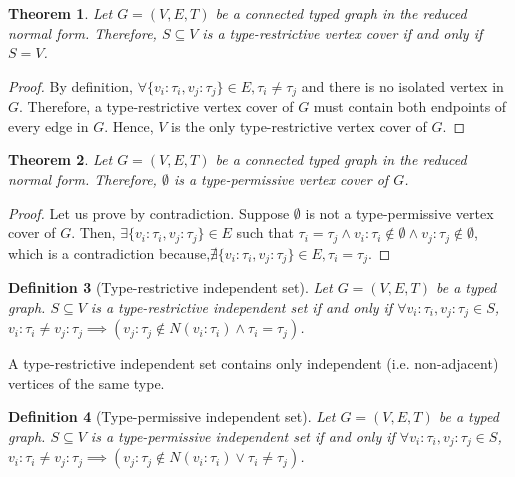 \documentclass[preprint,12pt]{elsarticle}
\theoremstyle{plain}
\newtheorem{theorem}{Theorem}[section]
\newtheorem{definition}[theorem]{Definition}
\newcommand\tyv[2]{#1\!\!:\!\!#2}
\begin{document}
\begin{theorem}
Let $G = (V,E,T)$ be a connected typed graph in the reduced normal form.
Therefore, $S\subseteq V$ is a type-restrictive vertex cover
if and only if $S = V$.
\end{theorem}
\begin{proof}
By definition, $\forall \{\tyv{v_i}{\tau_i},\tyv{v_j}{\tau_j}\}\in E, \tau_i\neq\tau_j$
and there is no isolated vertex in $G$.
Therefore, a type-restrictive vertex cover of $G$ must contain both endpoints
of every edge in $G$.
Hence, $V$ is the only type-restrictive vertex cover of $G$.
\end{proof}

\begin{theorem}
Let $G = (V,E,T)$ be a connected typed graph in the reduced normal form.
Therefore, $\emptyset$ is a type-permissive vertex cover of $G$.
\end{theorem}
\begin{proof}
Let us prove by contradiction.
Suppose $\emptyset$ is not a type-permissive vertex cover of $G$.
Then, $\exists \{\tyv{v_i}{\tau_i},\tyv{v_j}{\tau_j}\}\in E$ such that
$\tau_i=\tau_j \wedge \tyv{v_i}{\tau_i}\notin\emptyset \wedge \tyv{v_j}{\tau_j}\notin\emptyset$,
which is a contradiction
because,$\nexists \{\tyv{v_i}{\tau_i},\tyv{v_j}{\tau_j}\}\in E, \tau_i=\tau_j$.
\end{proof}

\begin{definition}[Type-restrictive independent set]
Let $G = (V,E,T)$ be a typed graph.
$S\subseteq V$ is a type-restrictive independent set
if and only if
$\forall \tyv{v_i}{\tau_i},\tyv{v_j}{\tau_j}\in S$,
$\tyv{v_i}{\tau_i}\neq\tyv{v_j}{\tau_j} \implies (\tyv{v_j}{\tau_j}\notin N(\tyv{v_i}{\tau_i}) \wedge \tau_i=\tau_j)$.
\end{definition}

A type-restrictive independent set contains only independent (i.e. non-adjacent) vertices of the same type.

\begin{definition}[Type-permissive independent set]
Let $G = (V,E,T)$ be a typed graph.
$S\subseteq V$ is a type-permissive independent set
if and only if
$\forall \tyv{v_i}{\tau_i},\tyv{v_j}{\tau_j}\in S$,
$\tyv{v_i}{\tau_i}\neq\tyv{v_j}{\tau_j} \implies (\tyv{v_j}{\tau_j}\notin N(\tyv{v_i}{\tau_i}) \vee \tau_i\neq\tau_j)$.
\end{definition}
\end{document}
